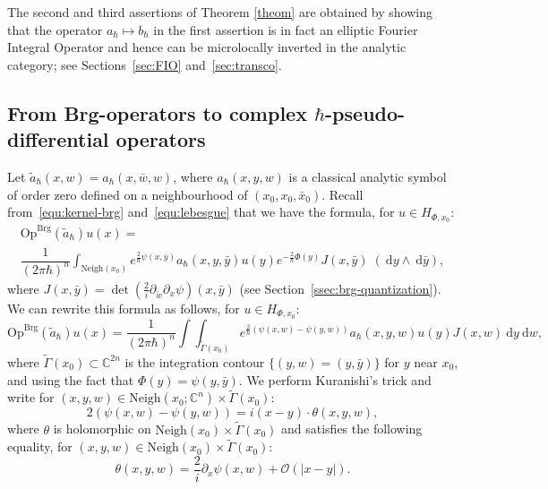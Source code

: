 \documentclass{article}
\newcommand{\Vois}{\mathrm{Neigh}}
\newcommand{\Op}{\mathrm{Op}}
\newcommand{\Brg}{\mathrm{Brg}}
\newcommand{\DD}{\:\!\mathrm{d}}
\newcommand{\intint}{\int\!\!\!\!\int}
\newcommand{\CM}{\mathbb{C}}
\newcommand{\h}{\hbar}
\begin{document}
The second and third assertions of Theorem \ref{theom} are obtained by
showing that the operator $a_\h\mapsto b_\h$ in the first assertion is
in fact an elliptic Fourier Integral Operator and hence can be
microlocally inverted in the analytic category; see
Sections~\ref{sec:FIO} and~\ref{sec:transco}.


\subsection{From Brg-operators to complex
  \texorpdfstring{$\h$}{h}-pseudo-differential operators}
\label{sec:from-brg-operators}


Let $\tilde a_\h(x,w)=a_\h(x,\bar w, w)$, where $a_{ \hbar}(x, y, w)$
is a classical analytic symbol of order zero defined on a
neighbourhood of $ (x_0, x_0, \bar{x}_0)$.  Recall
from~\eqref{equ:kernel-brg} and~\eqref{equ:lebesgue} that we have the
formula, for $u \in H_{ \Phi, x_0}$:
\begin{gather}
  \Op^{\Brg}(\tilde a_{ \hbar}) u(x) = \\
  \dfrac{1}{( 2 \pi \hbar)^{n}} \int_{\Vois(x_0)}
  e^{\frac{2}{\h}\psi(x, \bar{y})} a_{ \hbar}(x, y, \bar{y}) u(y)
  e^{-\frac{2}{\h}\Phi(y)} J(x, \bar{y}) \; (\DD y \wedge \DD
  \bar{y}),
\end{gather}
where
$J(x, \bar{y}) = \det \left(\frac{2}{i}\partial_{\tilde w} \partial_x
  \psi \right)(x, \bar{y})$
(see Section~\ref{ssec:brg-quantization}).  We can rewrite this
formula as follows, for $u \in H_{ \Phi, x_0}$:
\begin{equation}
  \Op^{\Brg}(\tilde a_{ \hbar}) u(x)
  = \dfrac{1}{( 2 \pi \hbar)^{n}} \intint_{\tilde{\Gamma}(x_0)} 
  e^{\frac{2}{\h}(\psi(x, w) - \psi(y, w))} a_{ \hbar}(x, y, w) u(y) J(x, w) \DD y \DD w,
\end{equation}
where $ \tilde{\Gamma}(x_0)\subset \CM^{2n}$ is the integration
contour $\{(y,w) = (y,\bar{y})\}$ for $y$ near $x_0$, and using the
fact that $ \Phi(y) = \psi(y, \bar{y})$.  We perform Kuranishi's trick
and write for
$(x, y, w) \in \Vois(x_0; \CM^{n}) \times \tilde{\Gamma}(x_0)$:
\[
2 \left( \psi(x, w) - \psi(y, w) \right) = i (x-y)\cdot \theta(x, y,
w) ,
\]
where $ \theta$ is holomorphic on
$ \Vois(x_0) \times \tilde{\Gamma}(x_0)$ and satisfies the following
equality, for $(x, y, w) \in \Vois(x_0) \times \tilde{\Gamma}(x_0)$:
\begin{equation} \label{eq_Kuranishi_trick} \theta(x, y, w) =
  \dfrac{2}{i} \partial_x \psi(x, w) + \mathcal{O}( |x-y|).
\end{equation}
\end{document}
